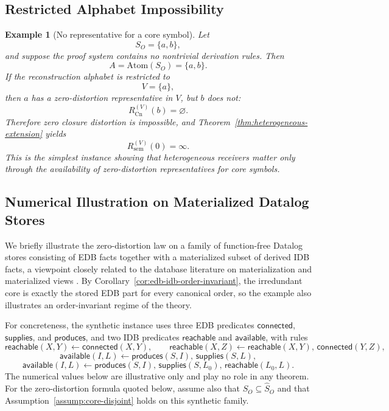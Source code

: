 \documentclass[journal,onecolumn]{IEEEtran}
\newcommand{\Atom}{\text{Atom}}
\newcommand{\Cn}{\text{Cn}}
\newtheorem{example}{Example}[section]
\numberwithin{equation}{section}
\begin{document}
\subsection{Restricted Alphabet Impossibility}
\label{app:counterexample-restricted-alphabet}

\begin{example}[No representative for a core symbol]
\label{ex:restricted-alphabet-impossible}
Let
\[
  S_O=\{a,b\},
\]
and suppose the proof system contains no nontrivial derivation rules.
Then
\[
  A=\Atom(S_O)=\{a,b\}.
\]
If the reconstruction alphabet is restricted to
\[
  V=\{a\},
\]
then \(a\) has a zero-distortion representative in \(V\), but \(b\)
does not:
\[
  R_{\Cn}^{(V)}(b)=\varnothing.
\]
Therefore zero closure distortion is impossible, and
Theorem~\ref{thm:heterogeneous-extension} yields
\[
  R_{\mathrm{sem}}^{(V)}(0)=\infty.
\]
This is the simplest instance showing that heterogeneous receivers
matter only through the availability of zero-distortion
representatives for core symbols.
\end{example}

\subsection{Numerical Illustration on Materialized Datalog Stores}
\label{app:numerical-materialized}

We briefly illustrate the zero-distortion law on a family of
function-free Datalog stores consisting of EDB facts together with a
materialized subset of derived IDB facts, a viewpoint closely related
to the database literature on materialization and materialized views
\cite{gupta1995maintenance,gupta1998materialized,chaudhuri1995optimizing}.
By Corollary~\ref{cor:edb-idb-order-invariant}, the irredundant core
is exactly the stored EDB part for every canonical order, so the
example also illustrates an order-invariant regime of the theory.

For concreteness, the synthetic instance uses three EDB predicates
\(\mathsf{connected}\), \(\mathsf{supplies}\), and \(\mathsf{produces}\),
and two IDB predicates \(\mathsf{reachable}\) and \(\mathsf{available}\),
with rules
\[
  \mathsf{reachable}(X,Y)\leftarrow \mathsf{connected}(X,Y),
  \qquad
  \mathsf{reachable}(X,Z)\leftarrow
  \mathsf{reachable}(X,Y),\,\mathsf{connected}(Y,Z),
\]
\[
  \mathsf{available}(I,L)\leftarrow
  \mathsf{produces}(S,I),\,\mathsf{supplies}(S,L),
\]
\[
  \mathsf{available}(I,L)\leftarrow
  \mathsf{produces}(S,I),\,\mathsf{supplies}(S,L_0),\,
  \mathsf{reachable}(L_0,L).
\]
The numerical values below are illustrative only and play no role in
any theorem.
For the zero-distortion formula quoted below, assume also that
\(S_O\subseteq\hat S_O\) and that
Assumption~\ref{assump:core-disjoint} holds on this synthetic family.
\end{document}
